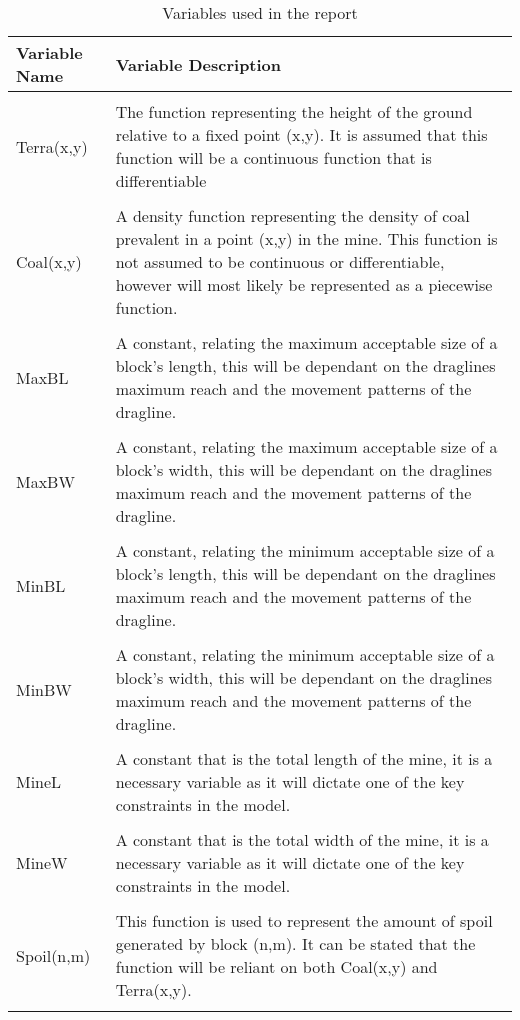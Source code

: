 \documentclass[12pt, openany, a4paper]{book}
\begin{document}
	\begin{table}[h!]
	\centering
	\caption{Variables used in the report}
	\begin{tabular}{p{5cm} p{11cm}}
		\textbf{Variable Name} & \textbf{Variable Description}\\ \hline  \\ 
		Terra(x,y) & The function representing the height of the ground relative to a fixed point (x,y). It is assumed that this function will be a continuous function that is differentiable \\ \hline \\ 
		Coal(x,y) & A density function representing the density of coal prevalent in a point (x,y) in the mine. This function is not assumed to be continuous or differentiable, however will most likely be represented as a piecewise function.
		\\ \hline \\
		MaxBL & A constant, relating the maximum acceptable size of a block's length, this will be dependant on the draglines maximum reach and the movement patterns of the dragline.
		\\ \hline \\ 
		MaxBW &  A constant, relating the maximum acceptable size of a block's width, this will be dependant on the draglines maximum reach and the movement patterns of the dragline.
		\\ \hline \\ 
		MinBL &  A constant, relating the minimum acceptable size of a block's length, this will be dependant on the draglines maximum reach and the movement patterns of the dragline.
		\\ \hline \\  
		MinBW &  A constant, relating the minimum acceptable size of a block's width, this will be dependant on the draglines maximum reach and the movement patterns of the dragline. \\ \hline \\
		MineL & A constant that is the total length of the mine, it is a necessary variable as it will dictate one of the key constraints in the model. \\ \hline \\
		MineW & A constant that is the total width of the mine, it is a necessary variable as it will dictate one of the key constraints in the model.\\ \hline \\ Spoil(n,m) & This function is used to represent the amount of spoil generated by block (n,m). It can be stated that the function will be reliant on both Coal(x,y) and Terra(x,y). \\ \hline \\

\end{tabular}
\end{table}
\end{document}
